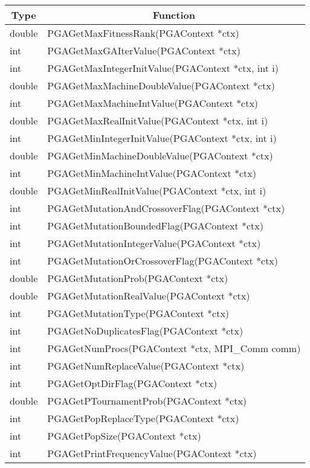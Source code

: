 \documentclass{report}
\begin{document}
\begin{tabular}{|l|l|} \hline\hline
\multicolumn{1}{|c|}{Type} &
\multicolumn{1}{c|}{Function}  \\  \hline\hline
double &  PGAGetMaxFitnessRank(PGAContext *ctx) \\ \hline
int &  PGAGetMaxGAIterValue(PGAContext *ctx) \\ \hline
int &  PGAGetMaxIntegerInitValue(PGAContext *ctx, int i) \\ \hline
double &  PGAGetMaxMachineDoubleValue(PGAContext *ctx) \\ \hline
int &  PGAGetMaxMachineIntValue(PGAContext *ctx) \\ \hline
double &  PGAGetMaxRealInitValue(PGAContext *ctx, int i) \\ \hline
int &  PGAGetMinIntegerInitValue(PGAContext *ctx, int i) \\ \hline
double &  PGAGetMinMachineDoubleValue(PGAContext *ctx) \\ \hline
int &  PGAGetMinMachineIntValue(PGAContext *ctx) \\ \hline
double &  PGAGetMinRealInitValue(PGAContext *ctx, int i) \\ \hline
int &  PGAGetMutationAndCrossoverFlag(PGAContext *ctx) \\ \hline
int &  PGAGetMutationBoundedFlag(PGAContext *ctx) \\ \hline
int &  PGAGetMutationIntegerValue(PGAContext *ctx) \\ \hline
int &  PGAGetMutationOrCrossoverFlag(PGAContext *ctx) \\ \hline
double &  PGAGetMutationProb(PGAContext *ctx) \\ \hline
double &  PGAGetMutationRealValue(PGAContext *ctx) \\ \hline
int &  PGAGetMutationType(PGAContext *ctx) \\ \hline
int &  PGAGetNoDuplicatesFlag(PGAContext *ctx) \\ \hline
int &  PGAGetNumProcs(PGAContext *ctx, MPI\_Comm comm) \\ \hline
int &  PGAGetNumReplaceValue(PGAContext *ctx) \\ \hline
int &  PGAGetOptDirFlag(PGAContext *ctx) \\ \hline
double &  PGAGetPTournamentProb(PGAContext *ctx) \\ \hline
int &  PGAGetPopReplaceType(PGAContext *ctx) \\ \hline
int &  PGAGetPopSize(PGAContext *ctx) \\ \hline
int &  PGAGetPrintFrequencyValue(PGAContext *ctx) \\ \hline

\end{tabular}
\end{document}
